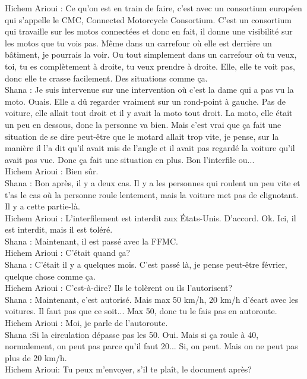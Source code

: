 Hichem Arioui : Ce qu'on est en train de faire, c'est avec un consortium européen qui s'appelle le CMC, Connected Motorcycle Consortium. C'est un consortium qui travaille sur les motos connectées et donc en fait, il donne une visibilité sur les motos que tu vois pas. Même dans un carrefour où elle est derrière un bâtiment, je pourrais la voir. Ou tout simplement dans un carrefour où tu veux, toi, tu es complètement à droite, tu veux prendre à droite. Elle, elle te voit pas, donc elle te crasse facilement. Des situations comme ça. \\
Shana : Je suis intervenue sur une intervention où c'est la dame qui a pas vu la moto. Ouais. Elle a dû regarder vraiment sur un rond-point à gauche. Pas de voiture, elle allait tout droit et il y avait la moto tout droit. La moto, elle était un peu en dessous, donc la personne va bien. Mais c'est vrai que ça fait une situation de se dire peut-être que le motard allait trop vite, je pense, sur la manière il l'a dit qu'il avait mis de l'angle et il avait pas regardé la voiture qu'il avait pas vue. Donc ça fait une situation en plus. Bon l'interfile ou... \\
Hichem Arioui : Bien sûr. \\
Shana : Bon après, il y a deux cas. Il y a les personnes qui roulent un peu vite et t'as le cas où la personne roule lentement, mais la voiture met pas de clignotant. Il y a cette partie-là. \\
Hichem Arioui : L'interfilement est interdit aux États-Unis. D'accord. Ok. Ici, il est interdit, mais il est toléré.\\
Shana : Maintenant, il est passé avec la FFMC. \\
Hichem Arioui : C'était quand ça? \\
Shana : C'était il y a quelques mois. C'est passé là, je pense peut-être février, quelque chose comme ça. \\
Hichem Arioui : C'est-à-dire? Ils le tolèrent ou ils l'autorisent? \\
Shana : Maintenant, c'est autorisé. Mais max 50 km/h, 20 km/h d'écart avec les voitures. Il faut pas que ce soit... Max 50, donc tu le fais pas en autoroute. \\
Hichem Arioui : Moi, je parle de l'autoroute. \\
Shana :Si la circulation dépasse pas les 50. Oui. Mais si ça roule à 40, normalement, on peut pas parce qu'il faut 20... Si, on peut. Mais on ne peut pas plus de 20 km/h. \\
Hichem Arioui: Tu peux m'envoyer, s'il te plaît, le document après?\\
